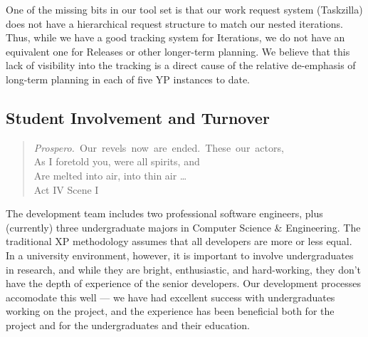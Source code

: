 \documentclass[times, 10pt,twocolumn]{article}
\begin{document}
One of the missing bits in our tool set is that our work request system
(Taskzilla) does not have a hierarchical request structure to match our
nested iterations.  Thus, while we have a good tracking system for
Iterations, we do not have an equivalent one for Releases or other
longer-term planning.  We believe that this lack of visibility into the
tracking is a direct cause of the relative de-emphasis of long-term planning
in each of five YP instances to date.

%
% 
% 

\pagebreak

\subsection{Student Involvement and Turnover}

\begin{quote}
\mbox{\emph{Prospero.} Our revels now are ended.  These our actors,} \\
As I foretold you, were all spirits, and \\
Are melted into air, into thin air \ldots \\
\hspace*{1cm} Act IV Scene I
\end{quote}

The development team includes two professional software engineers, plus
(currently) three undergraduate majors in Computer Science \& Engineering.
The traditional XP methodology assumes that all developers are more or less 
equal.  In a university environment, however, it is 
important to involve undergraduates
in research, and while they are bright, enthusiastic, and hard-working,
they don't have the depth of experience of the senior developers.  Our
development processes accomodate this well --- we have had excellent
success with undergraduates working on the project, and the experience has
been beneficial both for the project and for the undergraduates and their
education.  
\end{document}

